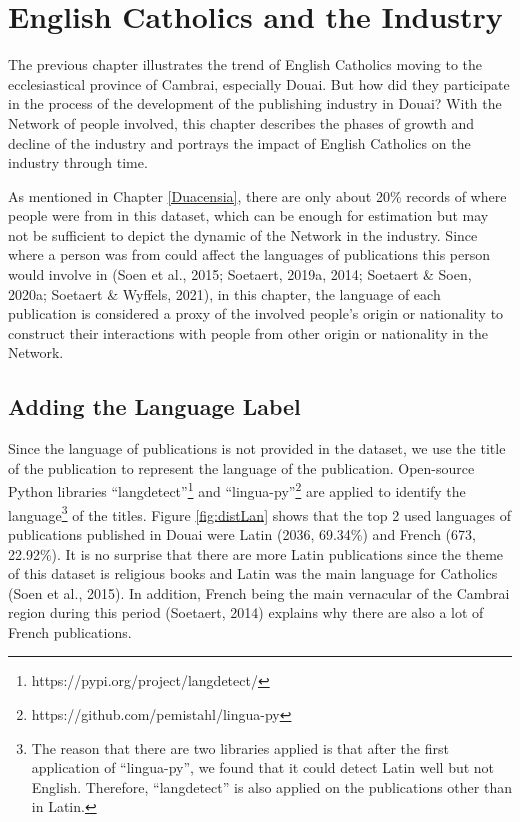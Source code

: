 \documentclass[12pt,a4paper,oneside]{book}
\begin{document}
\begin{sloppypar}
\chapter{English Catholics and the Industry}
\label{languages}
The previous chapter illustrates the trend of English Catholics moving to the ecclesiastical province of Cambrai, especially Douai. But how did they participate in the process of the development of the publishing industry in Douai? With the Network of people involved, this chapter describes the phases of growth and decline of the industry and portrays the impact of English Catholics on the industry through time.

As mentioned in Chapter \ref{Duacensia}, there are only about 20\% records of where people were from in this dataset, which can be enough for estimation but may not be sufficient to depict the dynamic of the Network in the industry. Since where a person was from could affect the languages of publications this person would involve in (Soen et al., 2015; Soetaert, 2019a, 2014; Soetaert \& Soen, 2020a; Soetaert \& Wyffels, 2021), in this chapter, the language of each publication is considered a proxy of the involved people’s origin or nationality to construct their interactions with people from other origin or nationality in the Network.

\section{Adding the Language Label}
Since the language of publications is not provided in the dataset, we use the title of the publication to represent the language of the publication. Open-source Python libraries “langdetect”\footnote{https://pypi.org/project/langdetect/} and “lingua-py”\footnote{https://github.com/pemistahl/lingua-py} are applied to identify the language\footnote{The reason that there are two libraries applied is that after the first application of “lingua-py”, we found that it could detect Latin well but not English. Therefore, “langdetect” is also applied on the publications other than in Latin.} of the titles. Figure \ref{fig:distLan} shows that the top 2 used languages of publications published in Douai were Latin (2036, 69.34\%) and French (673, 22.92\%). It is no surprise that there are more Latin publications since the theme of this dataset is religious books and Latin was the main language for Catholics (Soen et al., 2015). In addition, French being the main vernacular of the Cambrai region during this period (Soetaert, 2014) explains why there are also a lot of French publications.


\end{sloppypar}
\end{document}
